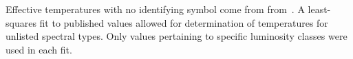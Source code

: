 
Effective temperatures with no identifying symbol come from from~\cite{Astrophysical Quantities Ed4}.  
A least-squares fit to published values allowed for determination of 
temperatures for unlisted spectral types.  Only values pertaining to specific 
luminosity classes were used in each fit.



